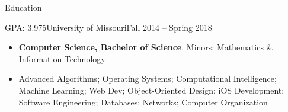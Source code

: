 \documentclass[]{mcdowellcv}
\begin{document}
    \makeheader

    \begin{cvsection}{Education}
        \begin{cvsubsection}{GPA: 3.975}{University of Missouri}{Fall 2014 -- Spring 2018}
            \begin{itemize}
                \item \textbf{Computer Science, Bachelor of Science}, Minors: Mathematics \& Information Technology
                \item Advanced Algorithms; Operating Systems; Computational Intelligence; Machine Learning; Web Dev; Object-Oriented Design;
                        iOS Development; Software Engineering; Databases; Networks; Computer Organization
            \end{itemize}
        \end{cvsubsection}
    \end{cvsection}
    
\end{document}
